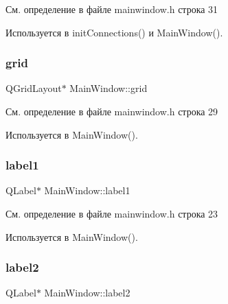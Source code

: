 См. определение в файле mainwindow.\+h строка 31



Используется в init\+Connections() и Main\+Window().

\hypertarget{class_main_window_a152a77e5d13ba05ca3deb8cec9ab0365}{}\label{class_main_window_a152a77e5d13ba05ca3deb8cec9ab0365} 
\subsubsection{\texorpdfstring{grid}{grid}}
{\footnotesize\ttfamily Q\+Grid\+Layout$\ast$ Main\+Window\+::grid\hspace{0.3cm}{\ttfamily [private]}}



См. определение в файле mainwindow.\+h строка 29



Используется в Main\+Window().

\hypertarget{class_main_window_a95477871d987adcaef8cfea7b87e27b0}{}\label{class_main_window_a95477871d987adcaef8cfea7b87e27b0} 
\subsubsection{\texorpdfstring{label1}{label1}}
{\footnotesize\ttfamily Q\+Label$\ast$ Main\+Window\+::label1\hspace{0.3cm}{\ttfamily [private]}}



См. определение в файле mainwindow.\+h строка 23



Используется в Main\+Window().

\hypertarget{class_main_window_ae83149c8748d57de45e882c51baef867}{}\label{class_main_window_ae83149c8748d57de45e882c51baef867} 
\subsubsection{\texorpdfstring{label2}{label2}}
{\footnotesize\ttfamily Q\+Label$\ast$ Main\+Window\+::label2\hspace{0.3cm}{\ttfamily [private]}}



